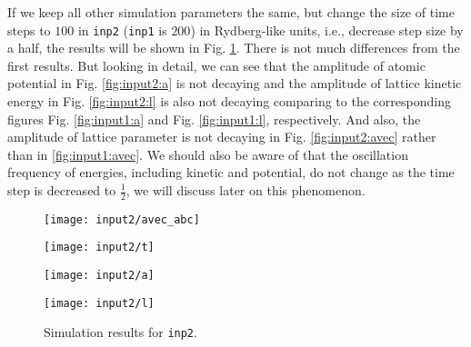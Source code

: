 If we keep all other simulation parameters the same, but change
the size of time steps to $100$ in \texttt{inp2} (\texttt{inp1} is $200$) in Rydberg-like units,
i.e., decrease step size by a half, the results will be shown in Fig. \ref{fig:input2}.
There is not much differences from the first results. But looking in detail,
we can see that the amplitude of atomic potential in Fig. \ref{fig:input2:a} is not decaying
and the amplitude of lattice kinetic energy in Fig. \ref{fig:input2:l} is also not decaying
comparing to the corresponding figures Fig. \ref{fig:input1:a} and Fig. \ref{fig:input1:l},
respectively. And also, the amplitude of lattice parameter is not decaying in
Fig. \ref{fig:input2:avec} rather than in \ref{fig:input1:avec}. We should also be aware of
that the oscillation frequency of energies, including kinetic and potential, do not change
as the time step is decreased to $\frac{ 1 }{ 2 }$, we will discuss later on this phenomenon.
\begin{figure}[H]
  \begin{minipage}[t]{0.45\textwidth}
    \texttt{[image: input2/avec\_abc]}
    \label{fig:input2:avec}
  \end{minipage}
  \hfil
  \begin{minipage}[t]{0.45\textwidth}
    \texttt{[image: input2/t]}
    \label{fig:input2:t}
  \end{minipage}
  \hfil
  \vfill
  \begin{minipage}[t]{0.45\textwidth}
    \texttt{[image: input2/a]}
    \label{fig:input2:a}
  \end{minipage}
  \hfil
  \begin{minipage}[t]{0.45\textwidth}
    \texttt{[image: input2/l]}
    \label{fig:input2:l}
  \end{minipage}
  \caption{Simulation results for \texttt{inp2}.}
  \label{fig:input2}
\end{figure}

